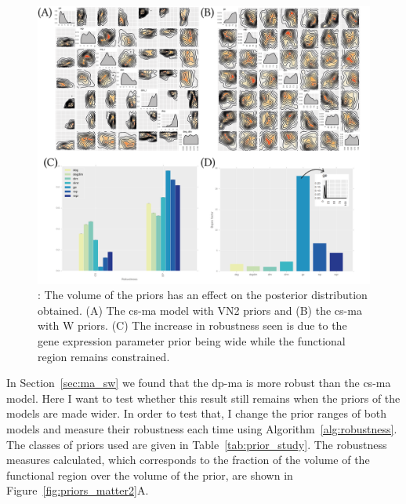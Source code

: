 \begin{figure}[h]
\begin{center}
\includegraphics[width=\textwidth]{../../chapters/chapterStabilityFinder/images/priors_matter.png}
\caption[The volume of the priors has an effect on the posterior distribution obtained.]{ \label{fig:priors_matter}: The volume of the priors has an effect on the posterior distribution obtained. (A) The \acrshort{cs-ma} model with VN2 priors and (B) the \acrshort{cs-ma} with W priors. (C) The increase in robustness seen is due to the gene expression parameter prior being wide while the functional region remains constrained.}
\end{center}
\end{figure}



In Section~\ref{sec:ma_sw} we found that the \acrshort{dp-ma} is more robust than the \acrshort{cs-ma} model. Here I want to test whether this result still remains when the priors of the models are made wider. In order to test that, I change the prior ranges of both models and measure their robustness each time using Algorithm~\ref{alg:robustness}. The classes of priors used are given in Table~\ref{tab:prior_study}. The robustness measures calculated, which corresponds to the fraction of the volume of the functional region over the volume of the prior, are shown in Figure~\ref{fig:priors_matter2}A. 


